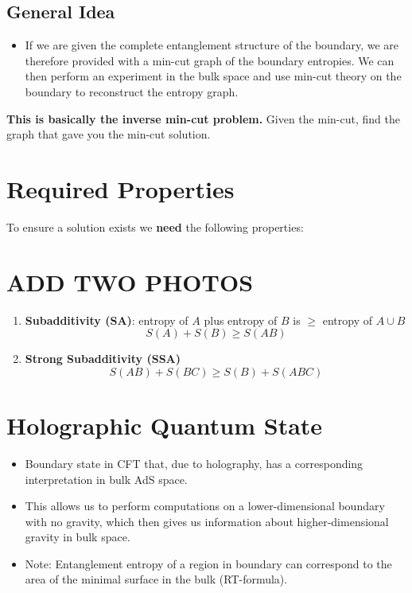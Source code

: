 \documentclass{article}
\begin{document}
\subsection{General Idea}
\begin{itemize}
    \item If we are given the complete entanglement structure of the boundary, we are therefore provided with a min-cut graph of the boundary entropies. We can then perform an experiment in the bulk space and use min-cut theory on the boundary to reconstruct the entropy graph.
\end{itemize}

\textbf{This is basically the inverse min-cut problem.} Given the min-cut, find the graph that gave you the min-cut solution. 

\section{Required Properties}
To ensure a solution exists we \textbf{need} the following properties:

\section{ ADD TWO PHOTOS}
\begin{enumerate}
    \item \textbf{Subadditivity (SA)}: entropy of \( A \) plus entropy of \( B \) is \( \geq \) entropy of \( A \cup B \)
    \[
    S(A) + S(B) \geq S(AB)
    \]
    
    \item \textbf{Strong Subadditivity (SSA)}
    \[
    S(AB) + S(BC) \geq S(B) + S(ABC)
    \]
\end{enumerate}

\section{Holographic Quantum State}
\begin{itemize}
    \item Boundary state in CFT that, due to holography, has a corresponding interpretation in bulk AdS space.
    \item This allows us to perform computations on a lower-dimensional boundary with no gravity, which then gives us information about higher-dimensional gravity in bulk space.
    \item Note: Entanglement entropy of a region in boundary can correspond to the area of the minimal surface in the bulk (RT-formula).
\end{itemize}
\end{document}
